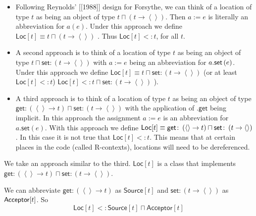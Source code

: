 \documentclass[12pt]{article}
\begin{document}
\begin{itemize}
\item Following Reynolds' [[1988]] design for Forsythe, we can think of a
location of type $t$ as being an object of type $t\sqcap \left( t\rightarrow
\left\langle {}\right\rangle \right) $. Then $a:=e$ is literally an
abbreviation for $a(e)$. Under this approach we define $\mathsf{Loc}%
[t]\equiv t\sqcap \left( t\rightarrow \left\langle {}\right\rangle \right) $%
. Thus $\mathsf{Loc}[t]<:t$, for all $t$.

\item A second approach is to think of a location of type $t$ as being an
object of type $t\sqcap \mathsf{set}\colon \left( t\rightarrow \left\langle
{}\right\rangle \right) $ with $a:=e$ being an abbreviation for $a.\mathsf{%
set}\left( e\right) $. Under this approach we define $\mathsf{Loc}[t]\equiv
t\sqcap \mathsf{set}\colon \left( t\rightarrow \left\langle {}\right\rangle
\right) $ (or at least $\mathsf{Loc}[t]<:t$) $\mathsf{Loc}[t]<:t\sqcap 
\mathsf{set}\colon \left( t\rightarrow \left\langle {}\right\rangle \right) $%
).

\item A third approach is to think of a location of type $t$ as being an
object of type $\mathsf{get}\colon \left( \left\langle {}\right\rangle
\rightarrow t\right) \sqcap \mathsf{set}\colon \left( t\rightarrow
\left\langle {}\right\rangle \right) $ with the application of $.\mathsf{get}
$ being implicit. In this approach the assignment $a:=e$ is an abbreviation
for $a.\mathsf{set}\left( e\right) $. With this approach we define $\mathsf{%
Loc}[t]\equiv \mathsf{get}\colon \left( \left\langle {}\right\rangle
\rightarrow t\right) \sqcap \mathsf{set}\colon \left( t\rightarrow
\left\langle {}\right\rangle \right) $. In this case it is not true that $%
\mathsf{Loc}[t]<:t$. This means that at certain places in the code (called
R-contexts), locations will need to be dereferenced.
\end{itemize}

We take an approach similar to the third. $\mathsf{Loc}[t]$ is a class that
implements $\mathsf{get}\colon \left( \left\langle {}\right\rangle
\rightarrow t\right) \sqcap \mathsf{set}\colon \left( t\rightarrow
\left\langle {}\right\rangle \right) $. 

We can abbreviate $\mathsf{get}\colon \left( \left\langle {}\right\rangle
\rightarrow t\right) $ as $\mathsf{Source}[t]$ and $\mathsf{set}\colon
\left( t\rightarrow \left\langle {}\right\rangle \right) $ as $\mathsf{%
Acceptor}[t]$. So%
\begin{equation*}
\mathsf{Loc}[t]<:\mathsf{Source}[t]\sqcap \mathsf{Acceptor}[t]
\end{equation*}
\end{document}
